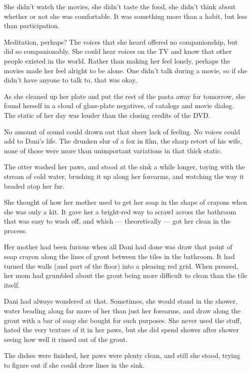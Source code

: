 She didn't watch the movies, she didn't taste the food, she didn't think about whether or not she was comfortable. It was something more than a habit, but less than participation.

Meditation, perhaps? The voices that she heard offered no companionship, but did so companionably. She could hear voices on the TV and know that other people existed in the world. Rather than making her feel lonely, perhaps the movies made her feel alright to be alone. One didn't talk during a movie, so if she didn't have anyone to talk to, that was okay.

As she cleaned up her plate and put the rest of the pasta away for tomorrow, she found herself in a cloud of glass-plate negatives, of catalogs and movie dialog. The static of her day was louder than the closing credits of the DVD.

No amount of sound could drown out that sheer lack of feeling. No voices could add to Dani's life. The drunken slur of a fox in film, the sharp retort of his wife, none of those were more than unimportant variations in that thick static.

The otter washed her paws, and stood at the sink a while longer, toying with the stream of cold water, brushing it up along her forearms, and watching the way it beaded atop her fur.

She thought of how her mother used to get her soap in the shape of crayons when she was only a kit. It gave her a bright-red way to scrawl across the bathroom that was easy to wash off, and which --- theoretically --- got her clean in the process.

Her mother had been furious when all Dani had done was draw that point of soap crayon along the lines of grout between the tiles in the bathroom. It had turned the walls (and part of the floor) into a pleasing red grid. When pressed, her mom had grumbled about the grout being more difficult to clean than the tile itself.

Dani had always wondered at that. Sometimes, she would stand in the shower, water beading along far more of her than just her forearms, and draw along the grout with a bar of soap she bought for such purposes. She never used the stuff, hated the very texture of it in her paws, but she did spend shower after shower seeing how well it rinsed out of the grout.

The dishes were finished, her paws were plenty clean, and still she stood, trying to figure out if she could draw lines in the sink.

